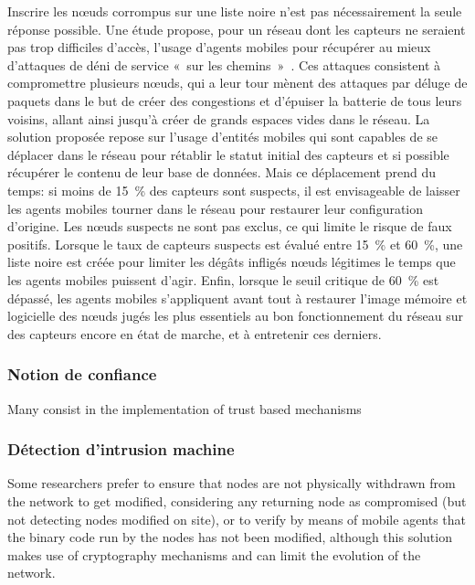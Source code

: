 Inscrire les nœuds corrompus sur une liste noire n'est pas nécessairement la seule réponse possible.
Une étude propose, pour un réseau dont les capteurs ne seraient pas trop difficiles d'accès, l'usage d'agents mobiles pour récupérer au mieux d'attaques de déni de service « sur les chemins »~\cite{LB09}.
Ces attaques consistent à compromettre plusieurs nœuds, qui a leur tour mènent des attaques par déluge de paquets dans le but de créer des congestions et d'épuiser la batterie de tous leurs voisins, allant ainsi jusqu'à créer de grands espaces vides dans le réseau.
La solution proposée repose sur l'usage d'entités mobiles qui sont capables de se déplacer dans le réseau pour rétablir le statut initial des capteurs et si possible récupérer le contenu de leur base de données.
Mais ce déplacement prend du temps: si moins de 15~\% des capteurs sont suspects, il est envisageable de laisser les agents mobiles tourner dans le réseau pour restaurer leur configuration d'origine.
Les nœuds suspects ne sont pas exclus, ce qui limite le risque de faux positifs.
Lorsque le taux de capteurs suspects est évalué entre 15~\% et 60~\%, une liste noire est créée pour limiter les dégâts infligés nœuds légitimes le temps que les agents mobiles puissent d'agir.
Enfin, lorsque le seuil critique de 60~\% est dépassé, les agents mobiles s'appliquent avant tout à restaurer l'image mémoire et logicielle des nœuds jugés les plus essentiels au bon fonctionnement du réseau sur des capteurs encore en état de marche, et à entretenir ces derniers.

\subsubsection{Notion de confiance}

Many consist in the implementation of trust based mechanisms\cite{MC10,F-GRL07} 




\subsubsection{Détection d'intrusion machine}\label{ea:sss:hids}
Some researchers prefer to ensure that nodes are not physically withdrawn from the network to get modified\cite{Ho10}, considering any returning node as compromised (but not detecting nodes modified on site), or to verify by means of mobile agents that the binary code run by the nodes has not been modified\cite{HR13}, although this solution makes use of cryptography mechanisms and can limit the evolution of the network.
